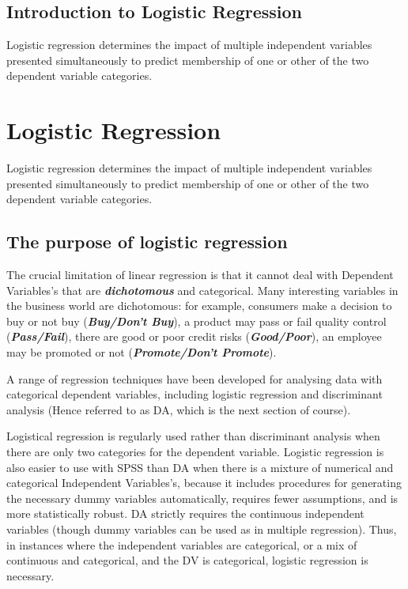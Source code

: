 \documentclass[a4paper,12pt]{article}
\begin{document}
\tableofcontents
\newpage
\subsection{Introduction to Logistic Regression}
Logistic regression determines the impact of multiple independent variables
presented simultaneously to predict membership of one or other of the two
dependent variable categories.


\newpage
\section{Logistic Regression}
Logistic regression determines the impact of multiple independent variables
presented simultaneously to predict membership of one or other of the two
dependent variable categories.

\subsection{The purpose of logistic regression}
The crucial limitation of linear regression is that it cannot deal with Dependent Variables’s that are \textbf{\textit{dichotomous}} and categorical. Many interesting variables in the business world are dichotomous: for
example, consumers make a decision to buy or not buy (\textit{\textbf{Buy/Don't Buy}}), a product may pass or fail quality control (\textit{\textbf{Pass/Fail}}), there are good or poor credit risks (\textit{\textbf{Good/Poor}}), an employee may be promoted or not (\textit{\textbf{Promote/Don't Promote}}).


A range of regression techniques have been developed for analysing data with categorical dependent
variables, including logistic regression and discriminant analysis (Hence referred to as DA, which is the next section of course).

Logistical regression is regularly used rather than discriminant analysis when there are only two categories
for the dependent variable. Logistic regression is also easier to use with SPSS than DA when
there is a mixture of numerical and categorical Independent Variables’s, because it includes procedures for
generating the necessary dummy variables automatically, requires fewer assumptions, and
is more statistically robust. DA strictly requires the continuous independent variables  (though dummy variables can be used as in multiple regression). Thus, in instances where
the independent variables are categorical, or a mix of continuous and categorical, and the
DV is categorical, logistic regression is necessary.
\end{document}
